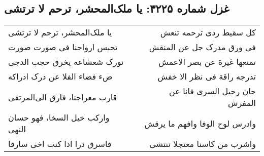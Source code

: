 \begin{center}
\section*{غزل شماره ۳۲۲۵: یا ملک‌المحشر، ترحم لا ترتشی}
\label{sec:3225}
\begin{longtable}{l p{0.5cm} r}
یا ملک‌المحشر، ترحم لا ترتشی
&&
کل سقیط ردی ترحمه تنعش
\\
تحبس ارواحنا فی صورت صورت
&&
فی ورق مدرک جل عن المنقش
\\
نورک شعشاعه یخرق حجب الدجی
&&
تمنعها غیرة عن بصر الاعمش
\\
ضء فضاء الفلا عن درک ادراکه
&&
تدرجه راقة فی نظر الا خفش
\\
قارب معراجنا، فارق الی‌المرتقی
&&
حان رحیل السری فانا عن المفرش
\\
وارکب خیل السخا، فهو حسان النهی
&&
وادرس لوح الوفا وافهم ما یرقش
\\
فاسرق درا اذا کنت اخی سارقا
&&
واشرب من کاسنا معتجلا تنتشی
\\
\end{longtable}
\end{center}

